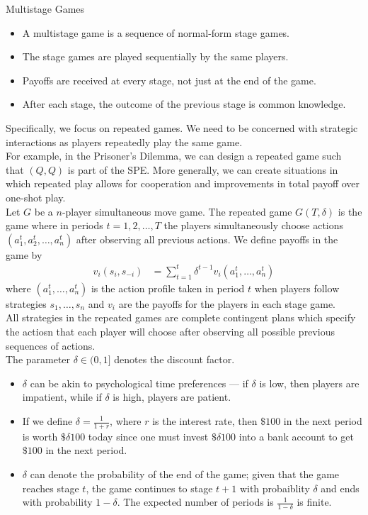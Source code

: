 \documentclass[10pt]{extarticle}
\begin{document}
  \begin{problem}{Multistage Games}
    \begin{itemize}
      \item A multistage game is a sequence of normal-form stage games.
      \item The stage games are played sequentially by the same players.
      \item Payoffs are received at every stage, not just at the end of the game.
      \item After each stage, the outcome of the previous stage is common knowledge.
    \end{itemize}
    Specifically, we focus on repeated games. We need to be concerned with strategic interactions as players repeatedly play the same game.\\

    For example, in the Prisoner's Dilemma, we can design a repeated game such that $(Q,Q)$ is part of the SPE. More generally, we can create situations in which repeated play allows for cooperation and improvements in total payoff over one-shot play.\\

    Let $G$ be a $n$-player simultaneous move game. The repeated game $G(T,\delta)$ is the game where in periods $t = 1,2,\dots,T$ the players simultaneously choose actions $(a_1^t,a_2^t,\dots,a_n^t)$ after observing all previous actions. We define payoffs in the game by
    \begin{align*}
      v_i\left(s_i,s_{-i}\right) &= \sum_{t=1}^{t}\delta^{t-1}v_i(a_1^t,\dots,a_n^t)
    \end{align*}
    where $(a_1^t,\dots,a_n^t)$ is the action profile taken in period $t$ when players follow strategies $s_1,\dots,s_n$ and $v_i$ are the payoffs for the players in each stage game.\\

    All strategies in the repeated games are complete contingent plans which specify the actiosn that each player will choose after observing all possible previous sequences of actions.\\

    The parameter $\delta\in (0,1]$ denotes the discount factor.
    \begin{itemize}
      \item $\delta$ can be akin to psychological time preferences --- if $\delta$ is low, then players are impatient, while if $\delta$ is high, players are patient.
      \item If we define $\delta = \frac{1}{1+r}$, where $r$ is the interest rate, then $\$100$ in the next period is worth $\$\delta 100$ today since one must invest $\$\delta 100$ into a bank account to get $\$100$ in the next period.
      \item $\delta$ can denote the probability of the end of the game; given that the game reaches stage $t$, the game continues to stage $t+1$ with probaiblity $\delta$ and ends with probability $1-\delta$. The expected number of periods is $\frac{1}{1-\delta}$ is finite.
    \end{itemize}
  \end{problem}
\end{document}
